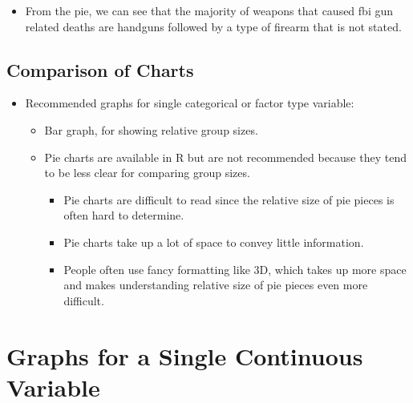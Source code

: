 \documentclass[
  letterpaper,
  DIV=11,
  numbers=noendperiod]{scrreprt}
\providecommand{\tightlist}{%
  \setlength{\itemsep}{0pt}\setlength{\parskip}{0pt}}\usepackage{longtable,booktabs,array}
\begin{document}
\begin{itemize}
\tightlist
\item
  From the pie, we can see that the majority of weapons that caused fbi
  gun related deaths are handguns followed by a type of firearm that is
  not stated.
\end{itemize}

\section{Comparison of Charts}\label{comparison-of-charts}

\begin{itemize}
\tightlist
\item
  Recommended graphs for single categorical or factor type variable:

  \begin{itemize}
  \tightlist
  \item
    Bar graph, for showing relative group sizes.
  \item
    Pie charts are available in R but are not recommended because they
    tend to be less clear for comparing group sizes.

    \begin{itemize}
    \tightlist
    \item
      Pie charts are difficult to read since the relative size of pie
      pieces is often hard to determine.
    \item
      Pie charts take up a lot of space to convey little information.
    \item
      People often use fancy formatting like 3D, which takes up more
      space and makes understanding relative size of pie pieces even
      more difficult.
    \end{itemize}
  \end{itemize}
\end{itemize}


\chapter{Graphs for a Single Continuous
Variable}\label{graphs-for-a-single-continuous-variable}
\end{document}
